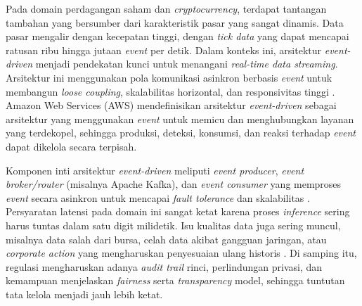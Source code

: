 Pada domain perdagangan saham dan \textit{cryptocurrency}, terdapat tantangan tambahan yang bersumber dari karakteristik pasar yang sangat dinamis. Data pasar mengalir dengan kecepatan tinggi, dengan \textit{tick data} yang dapat mencapai ratusan ribu hingga jutaan \textit{event} per detik. Dalam konteks ini, arsitektur \textit{event-driven} menjadi pendekatan kunci untuk menangani \textit{real-time data streaming}. Arsitektur ini menggunakan pola komunikasi asinkron berbasis \textit{event} untuk membangun \textit{loose coupling}, skalabilitas horizontal, dan responsivitas tinggi \autocite{aws2024edapatterns,stopford2018designing}. Amazon Web Services (AWS) mendefinisikan arsitektur \textit{event-driven} sebagai arsitektur yang menggunakan \textit{event} untuk memicu dan menghubungkan layanan yang terdekopel, sehingga produksi, deteksi, konsumsi, dan reaksi terhadap \textit{event} dapat dikelola secara terpisah.

Komponen inti arsitektur \textit{event-driven} meliputi \textit{event producer}, \textit{event broker/router} (misalnya Apache Kafka), dan \textit{event consumer} yang memproses \textit{event} secara asinkron untuk mencapai \textit{fault tolerance} dan skalabilitas \autocite{stopford2018designing}. Persyaratan latensi pada domain ini sangat ketat karena proses \textit{inference} sering harus tuntas dalam satu digit milidetik. Isu kualitas data juga sering muncul, misalnya data salah dari bursa, celah data akibat gangguan jaringan, atau \textit{corporate action} yang mengharuskan penyesuaian ulang historis \textcite{chien2022improve}. Di samping itu, regulasi mengharuskan adanya \textit{audit trail} rinci, perlindungan privasi, dan kemampuan menjelaskan \textit{fairness} serta \textit{transparency} model, sehingga tuntutan tata kelola menjadi jauh lebih ketat.


